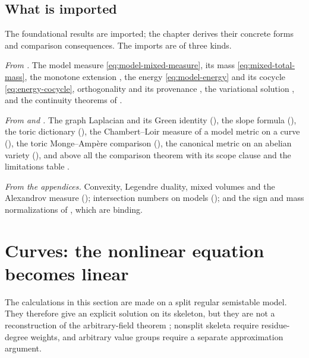 \subsection{What is imported}
\label{sec:ch31-imported}

The foundational results are imported; the chapter derives their concrete
forms and comparison consequences.  The imports are of three kinds.

\emph{From .}  The model measure
\eqref{eq:model-mixed-measure}, its mass \eqref{eq:mixed-total-mass}, the
monotone extension , the energy
\eqref{eq:model-energy} and its cocycle \eqref{eq:energy-cocycle},
orthogonality  and its provenance
, the variational solution
, and the continuity theorems of
.

\emph{From  and .}  The graph Laplacian and
its Green identity (), the slope formula
(), the toric dictionary
(), the Chambert--Loir measure of a model metric on a
curve (), the toric Monge--Amp\`ere
comparison (), the canonical metric on an abelian
variety (), and above all the comparison theorem
 with its scope clause and the limitations
table .

\emph{From the appendices.}  Convexity, Legendre duality, mixed volumes and
the Alexandrov measure (); intersection numbers on
models (); and the sign and mass
normalizations of , which are binding.

\section{Curves: the nonlinear equation becomes linear}
\label{sec:ch31-curves}

The calculations in this section are made on a split regular semistable
model.  They therefore give an explicit solution on its skeleton, but they
are not a reconstruction of the arbitrary-field theorem
; nonsplit skeleta require
residue-degree weights, and arbitrary value groups require a separate
approximation argument.


